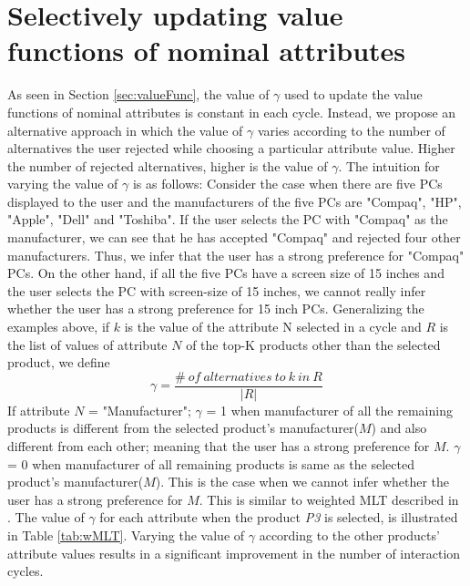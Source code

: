 \section{Selectively updating value functions of nominal attributes}
As seen in Section \ref{sec:valueFunc}, the value of $\gamma$ used to update the value functions of nominal attributes is constant in each cycle.
Instead, we propose an alternative approach in which the value of $\gamma$ varies according to the number of alternatives the user rejected while choosing a particular attribute value. 
Higher the number of rejected alternatives, higher is the value of $\gamma$.
The intuition for varying the value of $\gamma$ is as follows: Consider the case when there are five PCs displayed to the user and the manufacturers of the five PCs are "Compaq", "HP", "Apple", "Dell" and "Toshiba".
If the user selects the PC with "Compaq" as the manufacturer, we can see that he has accepted "Compaq" and rejected four other manufacturers.
Thus, we infer that the user has a strong preference for "Compaq" PCs.
On the other hand, if all the five PCs have a screen size of 15 inches and the user selects the PC with screen-size of 15 inches, we cannot really infer whether the user has a strong preference for 15 inch PCs.
Generalizing the examples above, if $k$ is the value of the attribute N selected in a cycle and $R$ is the list of values of attribute $N$ of the top-K products other than the selected product, we define
%
\begin{equation}
\gamma = \frac{\#\: of\: alternatives\: to\: k\: in\: R}{|R|}
\end{equation}
%
If attribute $N$ = "Manufacturer"; $\gamma$ = 1 when manufacturer of all the remaining products is different from the selected product's manufacturer($M$) and also different from each other; meaning that the user has a strong preference for $M$.
$\gamma$ = 0 when manufacturer of all remaining products is same as the selected product's manufacturer($M$).
This is the case when we cannot infer whether the user has a strong preference for $M$.
This is similar to weighted MLT described in \cite{comparisonbr}.
The value of $\gamma$ for each attribute when the product \textit{P3} is selected, is illustrated in Table \ref{tab:wMLT}.
Varying the value of $\gamma$ according to the other products' attribute values results in a significant improvement in the number of interaction cycles.



